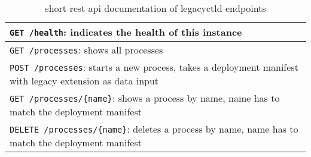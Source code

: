 \documentclass[../main.tex]{subfiles}
\begin{document}
    \begin{table}[h]
        \centering
        \begin{tabular}{p{10cm}}
            \midrule
            \verb|GET /health|: indicates the health of this instance \\ \midrule
            \verb|GET /processes|: shows all processes \\ \midrule
            \verb|POST /processes|: starts a new process, takes a deployment manifest with legacy extension as data input \\ \midrule
            \verb|GET /processes/{name}|: shows a process by name, name has to match the deployment manifest  \\ \midrule
            \verb|DELETE /processes/{name}|: deletes a process by name, name has to match the deployment manifest \\ \midrule
        \end{tabular}
        \captionsetup{justification=centering}
        \caption{
            short \acrshort{rest} \acrshort{api} documentation of \gls{legacyctld} endpoints
        }
        \label{tab:legacyctld_api}
    \end{table}
\end{document}
